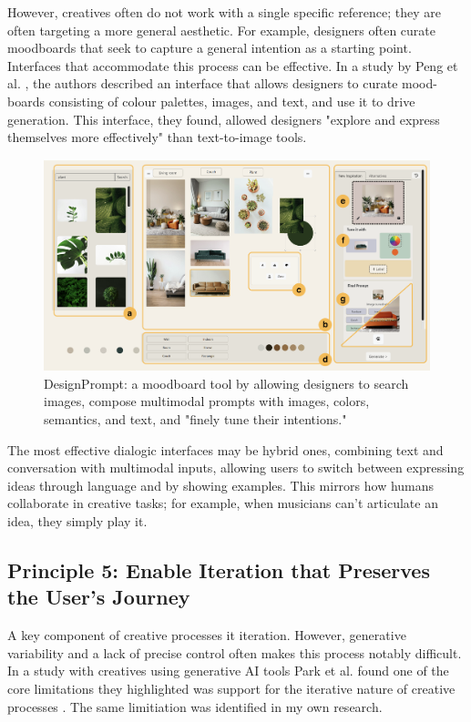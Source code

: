 However, creatives often do not work with a single specific reference; they are often targeting a more general aesthetic. For example, designers often curate moodboards that seek to capture a general intention as a starting point. Interfaces that accommodate this process can be effective. In a study by Peng et al. \cite{Peng2024-tr}, the authors described an interface that allows designers to curate mood-boards consisting of colour palettes, images, and text, and use it to drive generation. This interface, they found, allowed designers "explore and express themselves more effectively" than text-to-image tools.

\begin{figure}
    \centering
    \includegraphics[width=1\linewidth]{designprompt.png}
    \caption{DesignPrompt: a moodboard tool by \cite{Peng2024-tr} allowing designers to search images, compose multimodal prompts with images, colors, semantics, and text, and "finely tune their intentions."}
    \label{fig:enter-label}
\end{figure}

The most effective dialogic interfaces may be hybrid ones, combining text and conversation with multimodal inputs, allowing users to switch between expressing ideas through language and by showing examples. This mirrors how humans collaborate in creative tasks; for example, when musicians can't articulate an idea, they simply play it.

\subsection{Principle 5: Enable Iteration that Preserves the User's Journey}

A key component of creative processes it iteration. However, generative variability and a lack of precise control often makes this process notably difficult. In a study with creatives using generative AI tools Park et al. found one of the core limitations they highlighted was support for the iterative nature of creative processes \cite{Park2024-gw}. The same limitiation was identified in my own research. 

